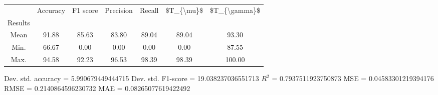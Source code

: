 \begin{tabular}{|c|c|c|c|c|c|c|}
\toprule
{} &  Accuracy &  F1 score &  Precision &  Recall &  \$T\_\{\textbackslash mu\}\$ &  \$T\_\{\textbackslash gamma\}\$ \\
Results &           &           &            &         &            &               \\
\hline
Mean    &     91.88 &     85.63 &      83.80 &   89.04 &      89.04 &         93.30 \\
Min.    &     66.67 &      0.00 &       0.00 &    0.00 &       0.00 &         87.55 \\
Max.    &     94.58 &     92.23 &      96.53 &   98.39 &      98.39 &        100.00 \\
\bottomrule
\end{tabular}

 Dev. std. accuracy = 5.990679449444715
 Dev. std. F1-score = 19.038237036551713
 $R^2$ = 0.7937511923750873
 MSE = 0.04583301219394176
 RMSE = 0.2140864596230732
 MAE = 0.08265077619422492